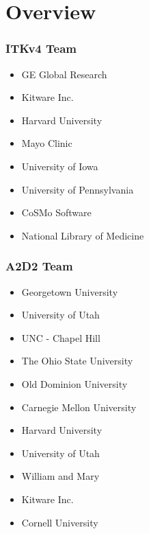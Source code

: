 \section{Overview}







{
\begin{frame}
\frametitle{ITKv4 Team}
\large
\begin{itemize}
\item GE Global Research
\item Kitware Inc.
\item Harvard University
\item Mayo Clinic
\item University of Iowa
\item University of Pennsylvania
\item CoSMo Software
\pause
\item National Library of Medicine
\end{itemize}
\end{frame}
}

{
\begin{frame}
\frametitle{A2D2 Team}
\large
\begin{itemize}
\item Georgetown University
\item University of Utah
\item UNC - Chapel Hill
\item The Ohio State University
\item Old Dominion University
\item Carnegie Mellon University
\item Harvard University
\item University of Utah
\item William and Mary
\item Kitware Inc.
\item Cornell University
\end{itemize}
\end{frame}
}

